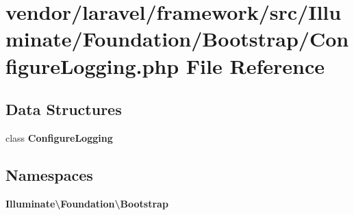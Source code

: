 \section{vendor/laravel/framework/src/\+Illuminate/\+Foundation/\+Bootstrap/\+Configure\+Logging.php File Reference}
\label{_configure_logging_8php}
\subsection*{Data Structures}
\begin{DoxyCompactItemize}
\item 
class {\bf Configure\+Logging}
\end{DoxyCompactItemize}
\subsection*{Namespaces}
\begin{DoxyCompactItemize}
\item 
 {\bf Illuminate\textbackslash{}\+Foundation\textbackslash{}\+Bootstrap}
\end{DoxyCompactItemize}
